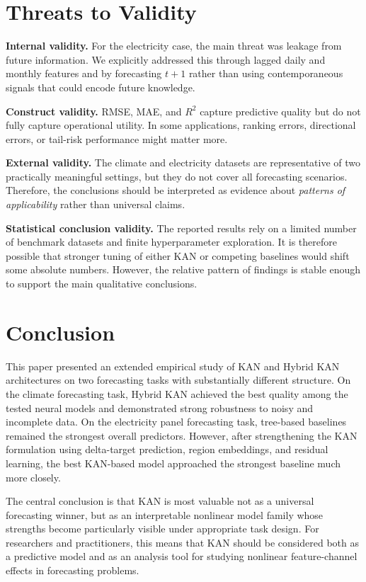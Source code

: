 \documentclass[10pt,conference,onecolumn]{IEEEtran}
\begin{document}
\section{Threats to Validity}

\textbf{Internal validity.} For the electricity case, the main threat was leakage from future information. We explicitly addressed this through lagged daily and monthly features and by forecasting $t+1$ rather than using contemporaneous signals that could encode future knowledge.

\textbf{Construct validity.} RMSE, MAE, and $R^2$ capture predictive quality but do not fully capture operational utility. In some applications, ranking errors, directional errors, or tail-risk performance might matter more.

\textbf{External validity.} The climate and electricity datasets are representative of two practically meaningful settings, but they do not cover all forecasting scenarios. Therefore, the conclusions should be interpreted as evidence about \emph{patterns of applicability} rather than universal claims.

\textbf{Statistical conclusion validity.} The reported results rely on a limited number of benchmark datasets and finite hyperparameter exploration. It is therefore possible that stronger tuning of either KAN or competing baselines would shift some absolute numbers. However, the relative pattern of findings is stable enough to support the main qualitative conclusions.

\section{Conclusion}

This paper presented an extended empirical study of KAN and Hybrid KAN architectures on two forecasting tasks with substantially different structure. On the climate forecasting task, Hybrid KAN achieved the best quality among the tested neural models and demonstrated strong robustness to noisy and incomplete data. On the electricity panel forecasting task, tree-based baselines remained the strongest overall predictors. However, after strengthening the KAN formulation using delta-target prediction, region embeddings, and residual learning, the best KAN-based model approached the strongest baseline much more closely.

The central conclusion is that KAN is most valuable not as a universal forecasting winner, but as an interpretable nonlinear model family whose strengths become particularly visible under appropriate task design. For researchers and practitioners, this means that KAN should be considered both as a predictive model and as an analysis tool for studying nonlinear feature-channel effects in forecasting problems.
\end{document}
